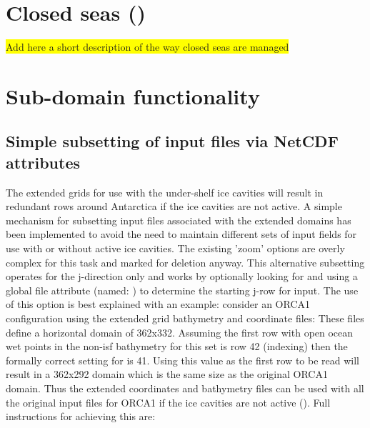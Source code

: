 \documentclass[../main/NEMO_manual]{subfiles}
\begin{document}
\section{Closed seas (\protect{})}
\label{sec:MISC_closea}

\colorbox{yellow}{Add here a short description of the way closed seas are managed}


\section{Sub-domain functionality}
\label{sec:MISC_zoom}

\subsection{Simple subsetting of input files via NetCDF attributes}

The extended grids for use with the under-shelf ice cavities will result in redundant rows around Antarctica if
the ice cavities are not active.
A simple mechanism for subsetting input files associated with the extended domains has been implemented to
avoid the need to maintain different sets of input fields for use with or without active ice cavities.
The existing 'zoom' options are overly complex for this task and marked for deletion anyway.
This alternative subsetting operates for the j-direction only and works by optionally looking for and
using a global file attribute (named: ) to determine the starting j-row for input.
The use of this option is best explained with an example:
consider an ORCA1 configuration using the extended grid bathymetry and coordinate files:
\vspace{-10pt}
\noindent These files define a horizontal domain of 362x332.
Assuming the first row with open ocean wet points in the non-isf bathymetry for this set is row 42
(\fortran indexing) then the formally correct setting for  is 41.
Using this value as the first row to be read will result in a 362x292 domain which is the same size as
the original ORCA1 domain.
Thus the extended coordinates and bathymetry files can be used with all the original input files for ORCA1 if
the ice cavities are not active ().
Full instructions for achieving this are:
\end{document}
